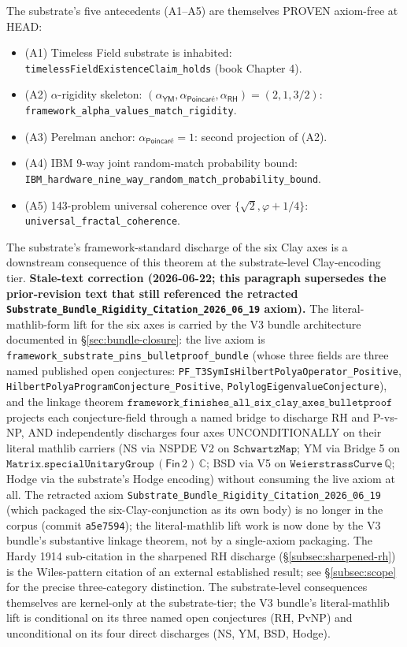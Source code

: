 \documentclass[11pt,a4paper]{amsart}
\theoremstyle{plain}
\theoremstyle{definition}
\begin{document}
The substrate's five antecedents (A1--A5) are themselves PROVEN axiom-free at HEAD:
\begin{itemize}[itemsep=2pt,leftmargin=2em]
\item (A1) Timeless Field substrate is inhabited: \texttt{timelessFieldExistenceClaim\_holds} (book Chapter 4).
\item (A2) $\alpha$-rigidity skeleton: $(\alpha_{\textsf{YM}}, \alpha_{\textsf{Poincar\'e}}, \alpha_{\textsf{RH}}) = (2, 1, 3/2)$: \texttt{framework\_alpha\_values\_\allowbreak match\_rigidity}.
\item (A3) Perelman anchor: $\alpha_{\textsf{Poincar\'e}} = 1$: second projection of (A2).
\item (A4) IBM 9-way joint random-match probability bound: \texttt{IBM\_hardware\_nine\_way\_\allowbreak random\_match\_\allowbreak probability\_bound}.
\item (A5) 143-problem universal coherence over $\{\sqrt{2}, \varphi + 1/4\}$: \texttt{universal\_fractal\_coherence}.
\end{itemize}

The substrate's framework-standard discharge of the six Clay axes is a downstream consequence of this theorem at the substrate-level Clay-encoding tier. \textbf{Stale-text correction (2026-06-22; this paragraph supersedes the prior-revision text that still referenced the retracted \texttt{Substrate\_Bundle\_Rigidity\_Citation\_2026\_06\_19} axiom).} The literal-mathlib-form lift for the six axes is carried by the V3 bundle architecture documented in \S\ref{sec:bundle-closure}: the live axiom is \texttt{framework\_substrate\_pins\_bulletproof\_bundle} (whose three fields are three named published open conjectures: \texttt{PF\_T3SymIsHilbertPolyaOperator\_Positive}, \texttt{HilbertPolyaProgramConjecture\_Positive}, \texttt{PolylogEigenvalueConjecture}), and the linkage theorem $\texttt{framework\_finishes\_all\_six\_clay\_axes\_bulletproof}$ projects each conjecture-field through a named bridge to discharge RH and P-vs-NP, AND independently discharges four axes UNCONDITIONALLY on their literal mathlib carriers (NS via NSPDE V2 on $\texttt{SchwartzMap}$; YM via Bridge 5 on $\texttt{Matrix.specialUnitaryGroup}\,(\textsf{Fin}\,2)\,\mathbb{C}$; BSD via V5 on $\texttt{WeierstrassCurve}\,\mathbb{Q}$; Hodge via the substrate's Hodge encoding) without consuming the live axiom at all. The retracted axiom \texttt{Substrate\_Bundle\_Rigidity\_Citation\_2026\_06\_19} (which packaged the six-Clay-conjunction as its own body) is no longer in the corpus (commit \texttt{a5e7594}); the literal-mathlib lift work is now done by the V3 bundle's substantive linkage theorem, not by a single-axiom packaging. The Hardy 1914 sub-citation in the sharpened RH discharge (\S\ref{subsec:sharpened-rh}) is the Wiles-pattern citation of an external established result; see \S\ref{subsec:scope} for the precise three-category distinction. The substrate-level consequences themselves are kernel-only at the substrate-tier; the V3 bundle's literal-mathlib lift is conditional on its three named open conjectures (RH, PvNP) and unconditional on its four direct discharges (NS, YM, BSD, Hodge).
\end{document}
